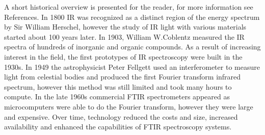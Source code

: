 \documentclass[reprint,amsmath,amssymb,aps, prl,superscriptaddress]{revtex4-2}
\begin{document}
A short historical overview is presented for the reader, for more information see References.
In 1800 IR was recognized as a distinct region of the energy spectrum by Sir William Herschel, however the study of IR light with various materials started about 100 years later. In 1903, William W.Coblentz measured the IR spectra of hundreds of inorganic and organic compounds\cite{scitool}.
As a result of increasing interest in the field, the first prototypes of IR spectroscopy were built in the 1930s.  In 1949 the astrophysicist Peter Fellgett used an interferometer to measure light from celestial bodies and produced the first Fourier transform infrared spectrum, however this method was still limited and took many hours to compute. In the late 1960s commercial FTIR spectrometers appeared as
microcomputers were able to do the Fourier transform, however
they were large and expensive. Over time, technology reduced the costs and size,
increased availability and enhanced the capabilities of FTIR spectroscopy systems\cite{spechistory}.
\end{document}
